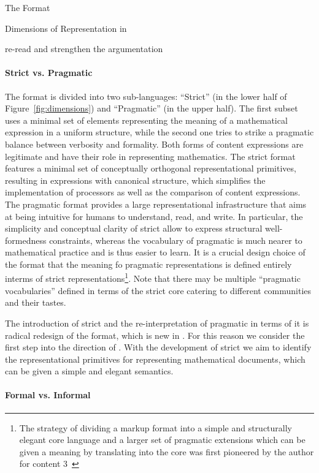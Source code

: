 \begin{omgroup}[creators=miko,id=spec-intro]{The \omdoc Format}
\begin{omgroup}[id=syntax-semantics]{Dimensions of Representation in \omdoc}
\begin{newpart}{re-read and strengthen the argumentation}
\paragraph{Strict vs. Pragmatic} The \omdoc format is divided into two sub-languages:
``Strict'' \omdoc (in the lower half of Figure~\ref{fig:dimensions}) and ``Pragmatic''
\omdoc (in the upper half). The first subset uses a minimal set of elements representing the meaning of a
mathematical expression in a uniform structure, while the second one tries to strike a
pragmatic balance between verbosity and formality. Both forms of content expressions are
legitimate and have their role in representing mathematics. The strict \omdoc format
features a minimal set of conceptually orthogonal representational primitives, resulting
in expressions with canonical structure, which simplifies the implementation of \omdoc
processors as well as the comparison of content expressions.  The pragmatic \omdoc
format provides a large representational infrastructure that aims at being intuitive for
humans to understand, read, and write. In particular, the simplicity and conceptual clarity of strict \omdoc allow to
express structural well-formedness constraints, whereas the vocabulary of pragmatic \omdoc
is much nearer to mathematical practice and is thus easier to learn. It is a crucial
design choice of the \omdoc format that the meaning fo pragmatic representations is
defined entirely interms of strict representations\footnote{The strategy of dividing a
  markup format into a simple and structurally elegant core language and a larger set of
  pragmatic extensions which can be given a meaning by translating into the core was first
  pioneered by the author for content {\mathml}3~\cite{CarlisleEd:MathML08}}. Note that
there may be multiple ``pragmatic vocabularies'' defined in terms of the strict core
catering to different communities and their tastes.

The introduction of strict \omdoc and the re-interpretation of pragmatic \omdoc in
terms of it is radical redesign of the \omdoc format, which is new in {}.
For this reason we consider {} the first step into the direction of
{}. With the development of strict \omdoc we aim to identify the
representational primitives for representing mathematical documents, which can be given a
simple and elegant semantics.

\paragraph{Formal vs. Informal} 


\end{newpart}
\end{omgroup}
\end{omgroup}
